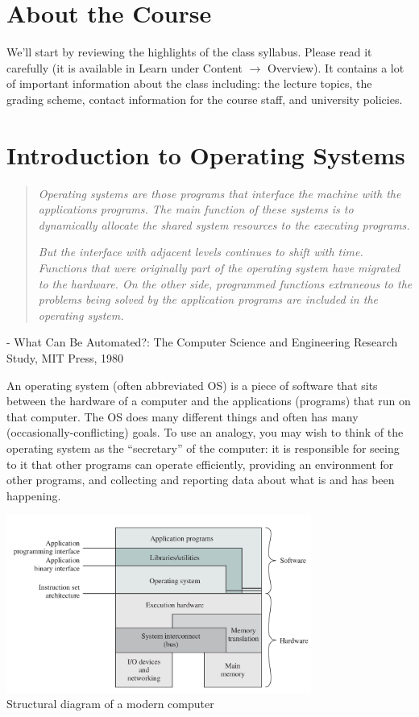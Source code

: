 




\section*{About the Course}
We'll start by reviewing the highlights of the class syllabus. Please read it carefully (it is available in Learn under Content $\rightarrow$ Overview). It contains a lot of important information about the class including: the lecture topics, the grading scheme, contact information for the course staff, and university policies.

\section*{Introduction to Operating Systems}


\begin{quote}
\textit{Operating systems are those programs that interface the machine with the applications programs. The main function of these systems is to dynamically allocate the shared system resources to the executing programs.}

\textit{But the interface with adjacent levels continues to shift with
time. Functions that were originally part of the operating system have migrated to the hardware. On the other side, programmed functions extraneous to the problems being solved by the application programs are included in the operating system.
}
\end{quote}

\hfill - What Can Be Automated?: The Computer Science and Engineering Research Study, MIT Press, 1980

An operating system (often abbreviated OS) is a piece of software that sits between the hardware of a computer and the applications (programs) that run on that computer. The OS does many different things and often has many (occasionally-conflicting) goals. To use an analogy, you may wish to think of the operating system as the ``secretary'' of the computer: it is responsible for seeing to it that other programs can operate efficiently, providing an environment for other programs, and collecting and reporting data about what is and has been happening.

\begin{center}
\includegraphics[width=0.75\textwidth]{images/os-sw-hw.png}\\
Structural diagram of a modern computer~\cite{osi}
\end{center}

